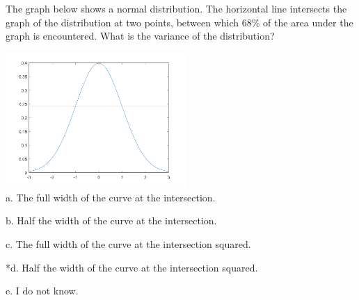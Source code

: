 
The graph below shows a normal distribution. The horizontal line
intersects the graph of the distribution at two points, between which 68\% of the area
under the graph is encountered. What is the variance of the distribution?

\includegraphics[width=2.70139in,height=2.02604in]{../../Images/AverageAndVarianceQ2.png}\\

a. The full width of the curve at the intersection.

b. Half the width of the curve at the intersection.

c. The full width of the curve at the intersection squared.

*d. Half the width of the curve at the intersection squared.

e. I do not know.\\

